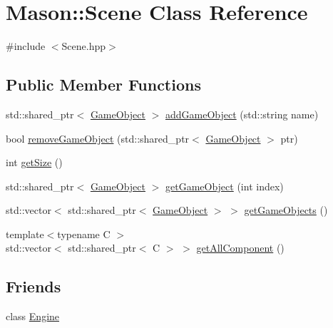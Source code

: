 \hypertarget{class_mason_1_1_scene}{}\section{Mason\+:\+:Scene Class Reference}
\label{class_mason_1_1_scene}


{\ttfamily \#include $<$Scene.\+hpp$>$}

\subsection*{Public Member Functions}
\begin{DoxyCompactItemize}
\item 
std\+::shared\+\_\+ptr$<$ \hyperlink{class_mason_1_1_game_object}{Game\+Object} $>$ \hyperlink{class_mason_1_1_scene_afe8ac9cb371c04a0587faf06bf828ac9}{add\+Game\+Object} (std\+::string name)
\item 
bool \hyperlink{class_mason_1_1_scene_aad5427fcdd330f65dc4e7b1e627afce4}{remove\+Game\+Object} (std\+::shared\+\_\+ptr$<$ \hyperlink{class_mason_1_1_game_object}{Game\+Object} $>$ ptr)
\item 
int \hyperlink{class_mason_1_1_scene_a97780dbb825e92c62b02623fe1e297fa}{get\+Size} ()
\item 
std\+::shared\+\_\+ptr$<$ \hyperlink{class_mason_1_1_game_object}{Game\+Object} $>$ \hyperlink{class_mason_1_1_scene_ae13738888d4f00135fb827639f87239b}{get\+Game\+Object} (int index)
\item 
std\+::vector$<$ std\+::shared\+\_\+ptr$<$ \hyperlink{class_mason_1_1_game_object}{Game\+Object} $>$ $>$ \hyperlink{class_mason_1_1_scene_a045d786fa6f11ab01e190971637b15ce}{get\+Game\+Objects} ()
\item 
{\footnotesize template$<$typename C $>$ }\\std\+::vector$<$ std\+::shared\+\_\+ptr$<$ C $>$ $>$ \hyperlink{class_mason_1_1_scene_a0766a39a27d936b12a93cb3f49ee32b0}{get\+All\+Component} ()
\end{DoxyCompactItemize}
\subsection*{Friends}
\begin{DoxyCompactItemize}
\item 
class \hyperlink{class_mason_1_1_scene_a3e1914489e4bed4f9f23cdeab34a43dc}{Engine}
\end{DoxyCompactItemize}


